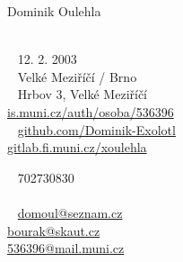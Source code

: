 \documentclass{modernsimplecv}
\begin{document}
\begin{minipage}[t]{0.77\textwidth}
\vspace{0pt} %
\begin{shaded*}

\begin{minipage}[t]{0.4\textwidth}
\vspace{0pt} %
{\par\centering\huge\textsf{Dominik Oulehla}} \\[0.3cm]
\faBirthdayCake~ 12. 2. 2003 \\
\faMapMarker~ Velké Meziříčí / Brno \\

\faEnvelopeO~ Hrbov 3, Velké Meziříčí \\

{\small
 \protect\url{is.muni.cz/auth/osoba/536396} \\
\faGithub~ \protect\url{github.com/Dominik-Exolotl} \\
 \protect\url{gitlab.fi.muni.cz/xoulehla}
}
\end{minipage}\hfill
\begin{minipage}[t]{0.55\textwidth}
\vspace{0pt} %
\faPhone~ 702730830 \\ \\
\large
\faAt~ \protect\url{domoul@seznam.cz}\\
 \protect\url{bourak@skaut.cz} \\
 \protect\url{536396@mail.muni.cz} \normalsize\\

\end{minipage}
\hfill
\end{shaded*}
\end{minipage}\\[15pt]



\subsection*{}
\vspace{-3em}
\end{document}
